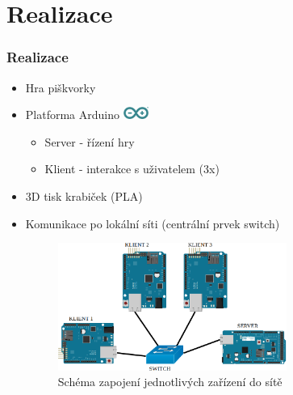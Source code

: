 \documentclass{beamer}
\begin{document}
\section{Realizace}
\begin{frame}
\frametitle{Realizace}
 \begin{itemize}
 \item Hra piškvorky
 \item Platforma Arduino \includegraphics[height=0.4cm]{img/Arduino.png}
 	\begin{itemize}
 		\item Server - řízení hry
 		\item Klient - interakce s uživatelem (3x)
 	\end{itemize}
 \item 3D tisk krabiček (PLA)
 \item Komunikace po lokální síti (centrální prvek switch)
 
 \pause
 \begin{figure}
 \centering
 \includegraphics[width=7.5cm]{img/schema_net.png}
 \caption{Schéma zapojení jednotlivých zařízení do sítě}
 \end{figure}
 \end{itemize}
\end{frame}
\end{document}
